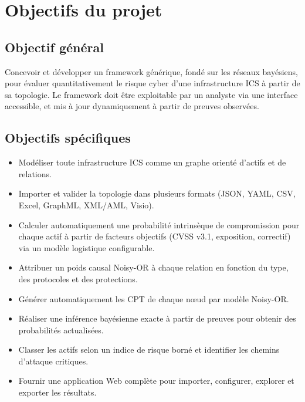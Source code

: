 \documentclass[12pt,a4paper]{article}
\newcommand{\forcereset}[1]{}
\begin{document}
\section{Objectifs du projet}
\forcereset{6}

\subsection{Objectif général}
\forcereset{4}

Concevoir et développer un framework générique, fondé sur les réseaux bayésiens, pour évaluer quantitativement le risque cyber d'une infrastructure ICS à partir de sa topologie. Le framework doit être exploitable par un analyste via une interface accessible, et mis à jour dynamiquement à partir de preuves observées.

\subsection{Objectifs spécifiques}
\forcereset{5}

\begin{itemize}[leftmargin=1.2cm, itemsep=0.2\baselineskip]
    \item Modéliser toute infrastructure ICS comme un graphe orienté d'actifs et de relations.
    \item Importer et valider la topologie dans plusieurs formats (JSON, YAML, CSV, Excel, GraphML, XML/AML, Visio).
    \item Calculer automatiquement une probabilité intrinsèque de compromission pour chaque actif à partir de facteurs objectifs (CVSS v3.1, exposition, correctif) via un modèle logistique configurable.
    \item Attribuer un poids causal Noisy-OR à chaque relation en fonction du type, des protocoles et des protections.
    \item Générer automatiquement les CPT de chaque nœud par modèle Noisy-OR.
    \item Réaliser une inférence bayésienne exacte à partir de preuves pour obtenir des probabilités actualisées.
    \item Classer les actifs selon un indice de risque borné et identifier les chemins d'attaque critiques.
    \item Fournir une application Web complète pour importer, configurer, explorer et exporter les résultats.
\end{itemize}
\end{document}
